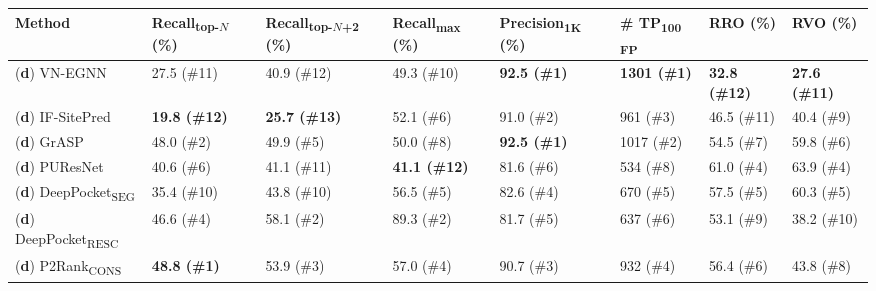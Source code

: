 \begin{landscape}
\begin{longtable}[c]{|M{29mm}|M{29mm}|M{31mm}|M{27mm}|M{30mm}|M{19mm}|M{18mm}|M{18mm}|}
\hline
\textbf{Method}         & \textbf{Recall\textsubscript{top-$N$}} (\%) & \textbf{Recall\textsubscript{top-$N$+2}} (\%) & \textbf{Recall\textsubscript{max}} (\%) & \textbf{Precision\textsubscript{1K}} (\%) & \textbf{\# TP\textsubscript{100 FP}} & \textbf{RRO} (\%) & \textbf{RVO} (\%) \\ \hline
\endfirsthead
%
\footnotesize{(\textbf{d})} VN-EGNN        & 27.5 (\#11)           & 40.9 (\#12)             & 49.3 (\#10)         & \textbf{\textcolor{CBBlue}{92.5 (\#1)}}                   & \textbf{\textcolor{CBBlue}{1301 (\#1)}}               & \textbf{\textcolor{CBOrange}{32.8 (\#12)}}             & \textbf{\textcolor{CBOrange}{27.6 (\#11)}}             \\ \hline
\footnotesize{(\textbf{d})} IF-SitePred    & \textbf{\textcolor{CBOrange}{19.8 (\#12) }}           & \textbf{\textcolor{CBOrange}{25.7 (\#13)}}             & 52.1 (\#6)         & 91.0 (\#2)             & 961 (\#3)         & 46.5 (\#11)     & 40.4 (\#9)     \\ \hline
\footnotesize{(\textbf{d})} GrASP          & 48.0 (\#2)              & 49.9 (\#5)             & 50.0 (\#8)           & \textbf{\textcolor{CBBlue}{92.5 (\#1)}}                   & 1017 (\#2)       & 54.5 (\#7)     & 59.8 (\#6)     \\ \hline
\footnotesize{(\textbf{d})} PUResNet       & 40.6 (\#6)            & 41.1 (\#11)             & \textbf{\textcolor{CBOrange}{41.1 (\#12)}}         & 81.6 (\#6)           & 534 (\#8)         & 61.0 (\#4)     & 63.9 (\#4)     \\ \hline
\footnotesize{(\textbf{d})} DeepPocket\textsubscript{SEG}  & 35.4 (\#10)            & 43.8 (\#10)             & 56.5 (\#5)         & 82.6 (\#4)           & 670 (\#5)         & 57.5 (\#5)     & 60.3 (\#5)     \\ \hline
\footnotesize{(\textbf{d})} DeepPocket\textsubscript{RESC} & 46.6 (\#4)            & 58.1 (\#2)                     & 89.3 (\#2)         & 81.7 (\#5)          & 637 (\#6)         & 53.1 (\#9)     & 38.2 (\#10)     \\ \hline
\footnotesize{(\textbf{d})} P2Rank\textsubscript{CONS}     & \textbf{\textcolor{CBBlue}{48.8 (\#1)}}           & 53.9 (\#3)             & 57.0 (\#4)           & 90.7 (\#3)           & 932 (\#4)         & 56.4 (\#6)     & 43.8 (\#8)     \\ \hline

\end{longtable}
\end{landscape}
